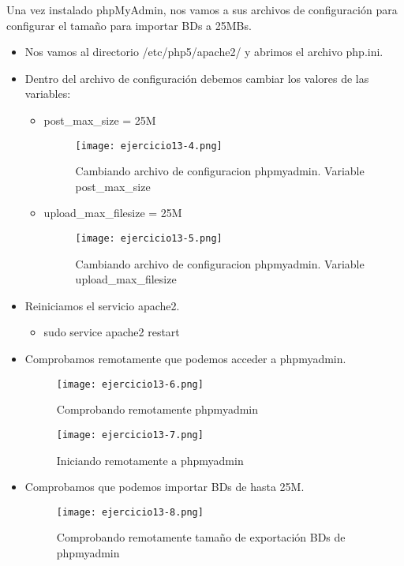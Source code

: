 	Una vez instalado phpMyAdmin, nos vamos a sus archivos de configuración\cite{ejercicio13-2,ejercicio13-3} para configurar el tamaño para importar BDs a 25MBs. 
	\begin{itemize}
		\item Nos vamos al directorio /etc/php5/apache2/ y abrimos el archivo php.ini.
		\item Dentro del archivo de configuración debemos cambiar los valores de las variables:
		\begin{itemize}
			\item post\_max\_size = 25M
				\begin{figure}[H]	
					\centering
					\texttt{[image: ejercicio13-4.png]} 
					\label{figura94} 
					\caption{Cambiando archivo de configuracion phpmyadmin. Variable post\_max\_size}
				\end{figure}
			\item upload\_max\_filesize = 25M
				\begin{figure}[H]	
					\centering
					\texttt{[image: ejercicio13-5.png]} 
					\label{figura95} 
					\caption{Cambiando archivo de configuracion phpmyadmin. Variable upload\_max\_filesize}
				\end{figure}
		\end{itemize}
		\item Reiniciamos el servicio apache2.
		\begin{itemize}
			\item sudo service apache2 restart
		\end{itemize}
		\item Comprobamos remotamente que podemos acceder a phpmyadmin.
			\begin{figure}[H]	
				\centering
				\texttt{[image: ejercicio13-6.png]} 
				\label{figura96} 
				\caption{Comprobando remotamente phpmyadmin}
			\end{figure}
			\begin{figure}[H]	
				\centering
				\texttt{[image: ejercicio13-7.png]} 
				\label{figura97} 
				\caption{Iniciando remotamente a phpmyadmin}
			\end{figure}
		\item Comprobamos que podemos importar BDs de hasta 25M.
			\begin{figure}[H]	
				\centering
				\texttt{[image: ejercicio13-8.png]} 
				\label{figura98} 
				\caption{Comprobando remotamente tamaño de exportación BDs de phpmyadmin}
			\end{figure}
	\end{itemize}
	
